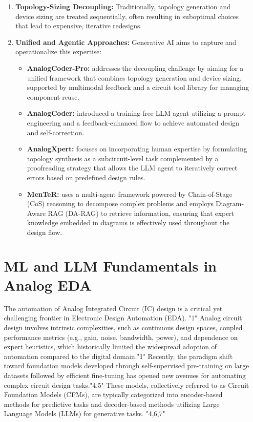 \documentclass{ieeeaccess}
\begin{document}
\begin{enumerate}
	\item \textbf{Topology-Sizing Decoupling:} Traditionally, topology generation and device sizing are treated sequentially, often resulting in suboptimal choices that lead to expensive, iterative redesigns.
	\item \textbf{Unified and Agentic Approaches:} Generative AI aims to capture and operationalize this expertise:
	      \begin{itemize}
		      \item \textbf{AnalogCoder-Pro:} addresses the decoupling challenge by aiming for a unified framework that combines topology generation and device sizing, supported by multimodal feedback and a circuit tool library for managing component reuse.
		      \item \textbf{AnalogCoder:} introduced a training-free LLM agent utilizing a prompt engineering and a feedback-enhanced flow to achieve automated design and self-correction.
		      \item \textbf{AnalogXpert:} focuses on incorporating human expertise by formulating topology synthesis as a subcircuit-level task complemented by a proofreading strategy that allows the LLM agent to iteratively correct errors based on predefined design rules.
		      \item \textbf{MenTeR:} uses a multi-agent framework powered by Chain-of-Stage (CoS) reasoning to decompose complex problems and employs Diagram-Aware RAG (DA-RAG) to retrieve information, ensuring that expert knowledge embedded in diagrams is effectively used throughout the design flow.
	      \end{itemize}
\end{enumerate}

\section{ML and LLM Fundamentals in Analog EDA} %
The automation of Analog Integrated Circuit (IC) design is a critical yet
challenging frontier in Electronic Design Automation (EDA). "1" Analog circuit
design involves intrinsic complexities, such as continuous design spaces,
coupled performance metrics (e.g., gain, noise, bandwidth, power), and
dependence on expert heuristics, which historically limited the widespread
adoption of automation compared to the digital domain."1" \newline Recently,
the paradigm shift toward foundation models developed through self-supervised
pre-training on large datasets followed by efficient fine-tuning has opened new
avenues for automating complex circuit design tasks."4,5" These models,
collectively referred to as Circuit Foundation Models (CFMs), are typically
categorized into encoder-based methods for predictive tasks and decoder-based
methods utilizing Large Language Models (LLMs) for generative tasks. "4,6,7"
\end{document}

